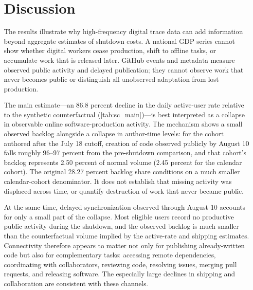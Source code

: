 \section{Discussion}
\label{sec:discussion}

The results illustrate why high-frequency digital trace data can add information beyond aggregate estimates of shutdown costs. A national GDP series cannot show whether digital workers cease production, shift to offline tasks, or accumulate work that is released later. GitHub events and metadata measure observed public activity and delayed publication; they cannot observe work that never becomes public or distinguish all unobserved adaptation from lost production.

The main estimate---an 86.8 percent decline in the daily active-user rate relative to the synthetic counterfactual (\cref{tab:sc_main})---is best interpreted as a collapse in observable online software-production activity. The mechanism shows a small observed backlog alongside a collapse in author-time levels: for the cohort authored after the July 18 cutoff, creation of code observed publicly by August 10 falls roughly 96--97 percent from the pre-shutdown comparison, and that cohort's backlog represents 2.50 percent of normal volume (2.45 percent for the calendar cohort). The original 28.27 percent backlog share conditions on a much smaller calendar-cohort denominator. It does not establish that missing activity was displaced across time, or quantify destruction of work that never became public.

At the same time, delayed synchronization observed through August 10 accounts for only a small part of the collapse. Most eligible users record no productive public activity during the shutdown, and the observed backlog is much smaller than the counterfactual volume implied by the active-rate and shipping estimates. Connectivity therefore appears to matter not only for publishing already-written code but also for complementary tasks: accessing remote dependencies, coordinating with collaborators, reviewing code, resolving issues, merging pull requests, and releasing software. The especially large declines in shipping and collaboration are consistent with these channels.

